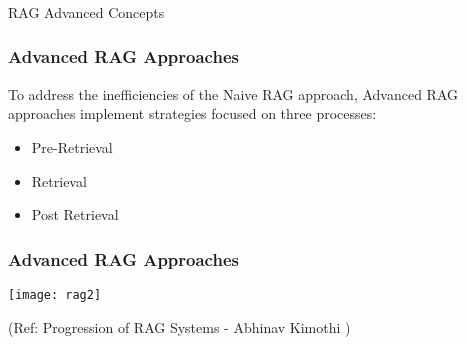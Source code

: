 \begin{frame}[fragile]\frametitle{}
\begin{center}
{\Large RAG Advanced Concepts}
\end{center}
\end{frame}


\begin{frame}[fragile]\frametitle{Advanced RAG Approaches}

To  address  the  inefficiencies  of  the  Naive  RAG  approach,  Advanced  RAG
approaches implement strategies focused on three processes:
\begin{itemize}
\item Pre-Retrieval
\item Retrieval
\item Post Retrieval
\end{itemize}	



\end{frame}

\begin{frame}[fragile]\frametitle{Advanced RAG Approaches}

\begin{center}
\texttt{[image: rag2]}

{\tiny (Ref: Progression of RAG Systems - Abhinav Kimothi )}
\end{center}	
\end{frame}


